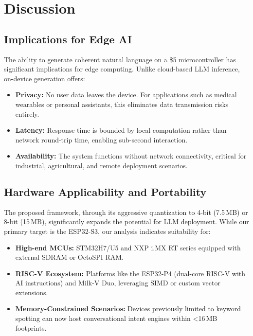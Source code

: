 \section{Discussion}
\label{sec:discussion}

\subsection{Implications for Edge AI}

The ability to generate coherent natural language on a \$5 microcontroller
has significant implications for edge computing. Unlike cloud-based LLM
inference, on-device generation offers:

\begin{itemize}[leftmargin=*,topsep=2pt,itemsep=1pt]
  \item \textbf{Privacy:} No user data leaves the device. For applications
        such as medical wearables or personal assistants, this eliminates
        data transmission risks entirely.
  \item \textbf{Latency:} Response time is bounded by local computation
        rather than network round-trip time, enabling sub-second interaction.
  \item \textbf{Availability:} The system functions without network
        connectivity, critical for industrial, agricultural, and remote
        deployment scenarios.
  \end{itemize}

\subsection{Hardware Applicability and Portability}

The proposed \tinybit{} framework, through its aggressive quantization to 4-bit (7.5\,MB) or 8-bit (15\,MB), significantly expands the potential for LLM deployment. While our primary target is the ESP32-S3, our analysis indicates suitability for:
\begin{itemize}[leftmargin=*,topsep=2pt,itemsep=1pt]
    \item \textbf{High-end MCUs:} STM32H7/U5 and NXP i.MX RT series equipped with external SDRAM or OctoSPI RAM.
    \item \textbf{RISC-V Ecosystem:} Platforms like the ESP32-P4 (dual-core RISC-V with AI instructions) and Milk-V Duo, leveraging SIMD or custom vector extensions.
    \item \textbf{Memory-Constrained Scenarios:} Devices previously limited to keyword spotting can now host conversational intent engines within <16\,MB footprints.
\end{itemize}

